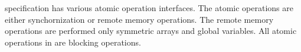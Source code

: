 \openshmem{} specification has various atomic operation interfaces. The atomic 
operations are either synchornization or remote memory operations. The remote memory 
operations are performed only symmetric arrays and global variables. 
All atomic operations in \openshmem{} are blocking operations.


